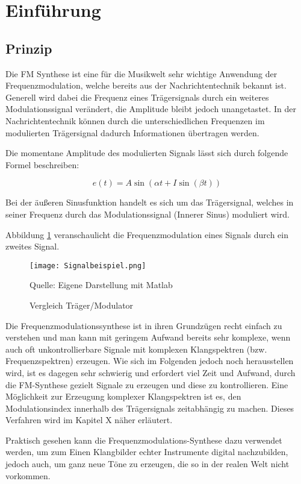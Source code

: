 \section{Einführung}

\subsection{Prinzip}
Die FM Synthese ist eine für die Musikwelt sehr wichtige Anwendung der Frequenzmodulation, welche bereits aus der Nachrichtentechnik bekannt ist. Generell wird dabei die Frequenz eines Trägersignals durch ein weiteres Modulationssignal verändert, die Amplitude bleibt jedoch unangetastet. In der Nachrichtentechnik können durch die unterschiedlichen Frequenzen im modulierten Trägersignal dadurch Informationen übertragen werden. 

Die momentane Amplitude des modulierten Signals lässt sich durch folgende Formel beschreiben:

\[
e(t) = A\sin(\alpha t + I\sin(\beta t)) 
\]

Bei der äußeren Sinusfunktion handelt es sich um das Trägersignal, welches in seiner Frequenz durch das Modulationssignal (Innerer Sinus) moduliert wird.

Abbildung \ref{fig:vergleichSignale} veranschaulicht die Frequenzmodulation eines Signals durch ein zweites Signal.

\begin{figure} [ht]
\centering
  \texttt{[image: Signalbeispiel.png]}
\caption{Vergleich Träger/Modulator}
\label{fig:vergleichSignale}
Quelle: Eigene Darstellung mit Matlab
\end{figure}

Die Frequenzmodulationssynthese ist in ihren Grundzügen recht einfach zu verstehen und man kann mit geringem Aufwand bereits sehr komplexe, wenn auch oft unkontrollierbare Signale mit komplexen Klangspektren (bzw. Frequenzspektren) erzeugen. Wie sich im Folgenden jedoch noch herausstellen wird, ist es dagegen sehr schwierig und erfordert viel Zeit und Aufwand, durch die FM-Synthese gezielt Signale zu erzeugen und diese zu kontrollieren. Eine Möglichkeit zur Erzeugung komplexer Klangspektren ist es, den Modulationsindex innerhalb des Trägersignals zeitabhängig zu machen. Dieses Verfahren wird im Kapitel X näher erläutert.

Praktisch gesehen kann die Frequenzmodulations-Synthese dazu verwendet werden, um zum Einen Klangbilder echter Instrumente digital nachzubilden, jedoch auch, um ganz neue Töne zu erzeugen, die so in der realen Welt nicht vorkommen.


